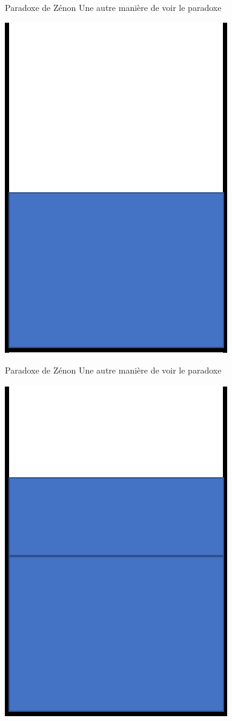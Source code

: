 \documentclass{beamer}
\begin{document}
\begin{frame}{Paradoxe de Zénon}
Une autre manière de voir le paradoxe
\begin{center}
	\includegraphics[scale=0.5]{glass1.png}
\end{center}
\end{frame}
\begin{frame}{Paradoxe de Zénon}
Une autre manière de voir le paradoxe
\begin{center}
	\includegraphics[scale=0.5]{glass2.png}
\end{center}
\end{frame}
\end{document}
